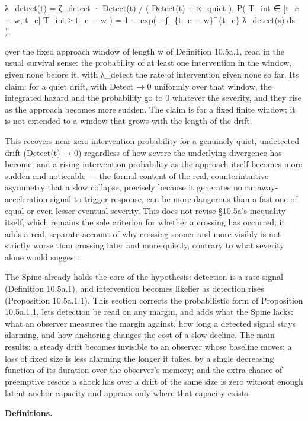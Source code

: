 \documentclass[
]{article}
\begin{document}
λ\_detect(t) = ζ\_detect · Detect(t) / ( Detect(t) + κ\_quiet ), P(
T\_int ∈ {[}t\_c − w, t\_c{]} \textbar{} T\_int ≥ t\_c − w ) = 1 − exp(
−∫\_\{t\_c − w\}\^{}\{t\_c\} λ\_detect(s) ds ),

over the fixed approach window of length w of Definition 10.5a.1, read
in the usual survival sense: the probability of at least one
intervention in the window, given none before it, with λ\_detect the
rate of intervention given none so far. Its claim: for a quiet drift,
with Detect → 0 uniformly over that window, the integrated hazard and
the probability go to 0 whatever the severity, and they rise as the
approach becomes more sudden. The claim is for a fixed finite window; it
is not extended to a window that grows with the length of the drift.

This recovers near-zero intervention probability for a genuinely quiet,
undetected drift (Detect(t) → 0) regardless of how severe the underlying
divergence has become, and a rising intervention probability as the
approach itself becomes more sudden and noticeable --- the formal
content of the real, counterintuitive asymmetry that a slow collapse,
precisely because it generates no runaway-acceleration signal to trigger
response, can be more dangerous than a fast one of equal or even lesser
eventual severity. This does not revise §10.5a's inequality itself,
which remains the sole criterion for whether a crossing has occurred; it
adds a real, separate account of why crossing sooner and more visibly is
not strictly worse than crossing later and more quietly, contrary to
what severity alone would suggest.

The Spine already holds the core of the hypothesis: detection is a rate
signal (Definition 10.5a.1), and intervention becomes likelier as
detection rises (Proposition 10.5a.1.1). This section corrects the
probabilistic form of Proposition 10.5a.1.1, lets detection be read on
any margin, and adds what the Spine lacks: what an observer measures the
margin against, how long a detected signal stays alarming, and how
anchoring changes the cost of a slow decline. The main results: a steady
drift becomes invisible to an observer whose baseline moves; a loss of
fixed size is less alarming the longer it takes, by a single decreasing
function of its duration over the observer's memory; and the extra
chance of preemptive rescue a shock has over a drift of the same size is
zero without enough latent anchor capacity and appears only where that
capacity exists.

\textbf{Definitions.}
\end{document}
